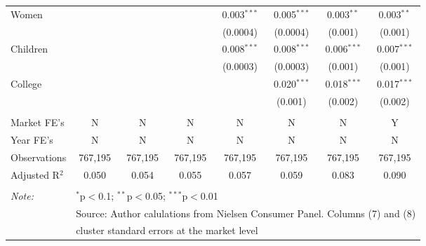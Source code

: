 \begin{table}[!htbp]
{\begin{tabular}{@{\extracolsep{5pt}}lccccccc}
  Women &  &  &  & 0.003$^{***}$ & 0.005$^{***}$ & 0.003$^{**}$ & 0.003$^{**}$ \\
  &  &  &  & (0.0004) & (0.0004) & (0.001) & (0.001) \\
  Children &  &  &  & 0.008$^{***}$ & 0.008$^{***}$ & 0.006$^{***}$ & 0.007$^{***}$ \\
  &  &  &  & (0.0003) & (0.0003) & (0.001) & (0.001) \\
  College &  &  &  &  & 0.020$^{***}$ & 0.018$^{***}$ & 0.017$^{***}$ \\
  &  &  &  &  & (0.001) & (0.002) & (0.002) \\
 \hline \\[-1.8ex]
Market FE's & N & N & N & N & N & N & Y \\
Year FE's & N & N & N & N & N & N & N \\
Observations & 767,195 & 767,195 & 767,195 & 767,195 & 767,195 & 767,195 & 767,195 \\
Adjusted R$^{2}$ & 0.050 & 0.054 & 0.055 & 0.057 & 0.059 & 0.083 & 0.090 \\
\hline
\hline \\[-1.8ex]
\textit{Note:}  & \multicolumn{7}{l}{$^{*}$p$<$0.1; $^{**}$p$<$0.05; $^{***}$p$<$0.01} \\
 & \multicolumn{7}{l}{Source: Author calulations from Nielsen Consumer Panel. Columns (7) and (8) } \\
 & \multicolumn{7}{l}{cluster standard errors at the market level} \\
\end{tabular}
}
\end{table}
